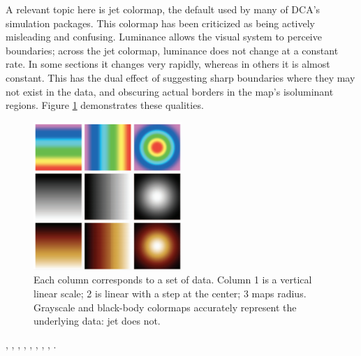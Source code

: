 \documentclass[11pt,a4paper,article]{memoir} %
\begin{document}
A relevant topic here is jet colormap, the default used by many of DCA's simulation packages. This colormap has been criticized as being actively misleading and confusing. Luminance allows the visual system to perceive boundaries; across the jet colormap, luminance does not change at a constant rate. In some sections it changes very rapidly, whereas in others it is almost constant. This has the dual effect of suggesting sharp boundaries where they may not exist in the data, and obscuring actual borders in the map's isoluminant regions. Figure \ref{fig:jet} demonstrates these qualities.
\begin{figure}
\centering
\includegraphics[width=0.5\textwidth]{jet.png}
\caption{\small{Each column corresponds to a set of data. Column 1 is a vertical linear scale; 2 is linear with a step at the center; 3 maps radius. Grayscale and black-body colormaps accurately represent the underlying data: jet does not.}}
\label{fig:jet}
\end{figure}

\cite{hastie2013elements}, \cite{gelman2013bayesian}, \cite{faraway2004linear}, \cite{blitzstein2014linear}, \cite{jaynes2003probability}, \cite{wickham2009ggplot2}, \cite{montgomery2000design}, \cite{kruschke2015doing}, \cite{iso2014statistical}.


\end{document}
